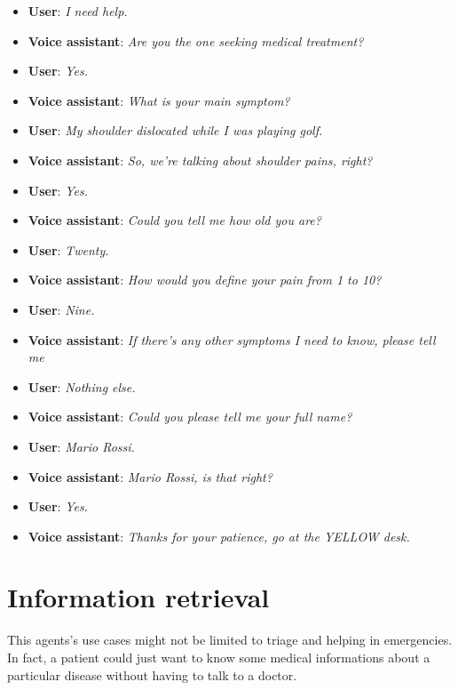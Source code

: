 \documentclass[conference]{IEEEtran}
\begin{document}
\begin{itemize}
    \item \textbf{User}: \textit{I need help.}
    \item \textbf{Voice assistant}: \textit{Are you the one seeking medical treatment?}
    \item \textbf{User}: \textit{Yes.}
    \item \textbf{Voice assistant}: \textit{What is your main symptom?}
    \item \textbf{User}: \textit{My shoulder dislocated while I was playing golf.}
    \item \textbf{Voice assistant}: \textit{So, we're talking about shoulder pains, right?}
    \item \textbf{User}: \textit{Yes.}
    \item \textbf{Voice assistant}: \textit{Could you tell me how old you are?}
    \item \textbf{User}: \textit{Twenty.}
    \item \textbf{Voice assistant}: \textit{How would you define your pain from 1 to 10?}
    \item \textbf{User}: \textit{Nine.}
    \item \textbf{Voice assistant}: \textit{If there's any other symptoms I need to know, please tell me}
    \item \textbf{User}: \textit{Nothing else.}
    \item \textbf{Voice assistant}: \textit{Could you please tell me your full name?}
    \item \textbf{User}: \textit{Mario Rossi.}
    \item \textbf{Voice assistant}: \textit{Mario Rossi, is that right?}
    \item \textbf{User}: \textit{Yes.}
    \item \textbf{Voice assistant}: \textit{Thanks for your patience, go at the YELLOW desk.}
\end{itemize}
\section{Information retrieval}
\label{sec:information-retrieval}
This agents's use cases might not be limited to triage and helping in emergencies. In fact, a patient could just want to know some medical informations about a particular disease without having to talk to a doctor.
\end{document}

